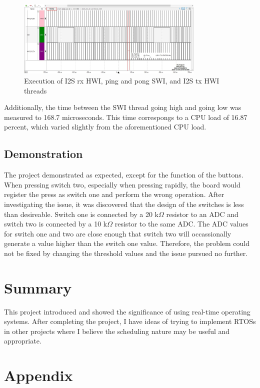 \documentclass[11pt,pdftex,portrait,letterpaper]{article}
\begin{document}
\begin{figure}[h]
\centering
\includegraphics[width=0.8\textwidth]{./execution2}
\caption{Execution of I2S rx HWI, ping and pong SWI, and I2S tx HWI threads}
\label{f:fig3}
\end{figure}

Additionally, the time between the SWI thread going high and going low was measured to 168.7 microseconds. This time correspongs to a CPU load of 16.87 percent, which varied slightly from the aforementioned CPU load. 

\subsection{Demonstration}

The project demonstrated as expected, except for the function of the buttons. When pressing switch two, especially when pressing rapidly, the board would register the press as switch one and perform the wrong operation. After investigating the issue, it was discovered that the design of the switches is less than desireable. Switch one is connected by a 20 k$\Omega$ resistor to an ADC and switch two is connected by a 10 k$\Omega$ resistor to the same ADC. The ADC values for switch one and two are close enough that switch two will occassionally generate a value higher than the switch one value. Therefore, the problem could not be fixed by changing the threshold values and the issue pursued no further.

\section{Summary}

This project introduced and showed the significance of using real-time operating systems. After completing the project, I have ideas of trying to implement RTOSs in other projects where I believe the scheduling nature may be useful and appropriate.

\pagebreak

\section{Appendix}
\end{document}
